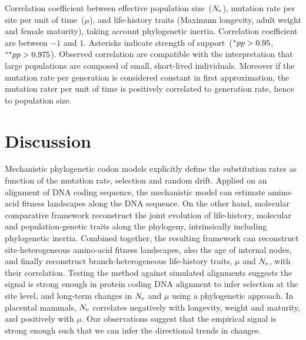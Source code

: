 \begin{table}[H]
	
	\caption[Traits correlation]{
		Correlation coefficient between effective population size~($N_{\mathrm{e}}$), mutation rate per site per unit of time~($\mu$), and life-history traits (Maximum longevity, adult weight and female maturity), taking account phylogenetic inertia.
		Correlation coefficient are between $-1$ and $1$.
		Asterisks indicate strength of support~($\smash{^{*}} pp > 0.95$, $\smash{^{**}} pp > 0.975$).
		Observed correlation are compatible with the interpretation that large populations are composed of small, short-lived individuals.
		Moreover if the mutation rate per generation is considered constant in first approximation, the mutation rater per unit of time is positively correlated to generation rate, hence to population size.
	}
	\label{fig:mammals_correlation}
\end{table}

\section{Discussion}
\label{sec:Discussion}
Mechanistic phylogenetic codon models explicitly define the substitution rates as function of the mutation rate, selection and random drift.
Applied on an alignment of DNA coding sequence, the mechanistic model can estimate amino-acid fitness landscapes along the DNA sequence.
On the other hand, molecular comparative framework reconstruct the joint evolution of life-history, molecular and population-genetic traits along the phylogeny, intrinsically including phylogenetic inertia.
Combined together, the resulting framework can reconstruct site-heterogeneous amino-acid fitness landscapes, also the age of internal nodes, and finally reconstruct branch-heterogeneous life-history traits, $\mu$ and $N_{\mathrm{e}}$, with their correlation.
Testing the method against simulated alignments suggests the signal is strong enough in protein coding DNA alignment to infer selection at the site level, and long-term changes in $N_{\mathrm{e}}$ and $\mu$ using a phylogenetic approach.
In placental mammals, $N_{\mathrm{e}}$ correlates negatively with longevity, weight and maturity, and positively with $\mu$.
Our observations suggest that the empirical signal is strong enough such that we can infer the directional trends in changes.

